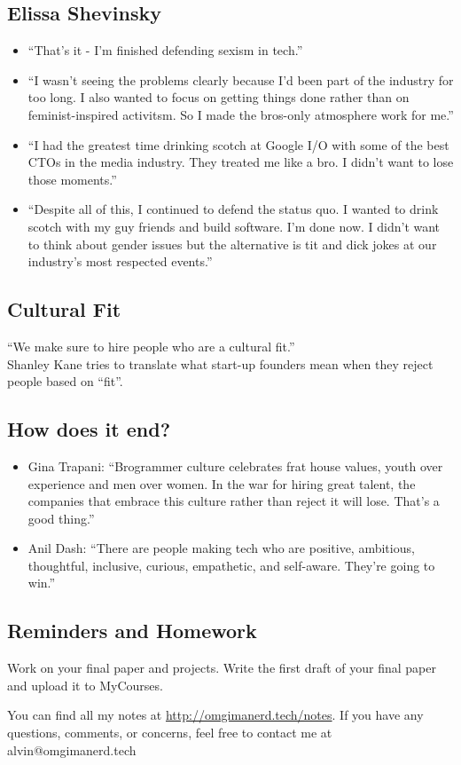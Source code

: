 \documentclass[letterpaper, 12pt]{article}
\begin{document}
\subsection*{Elissa Shevinsky}
\begin{itemize}
  \item ``That's it - I'm finished defending sexism in tech.''
  \item ``I wasn't seeing the problems clearly because I'd been part of the
    industry for too long. I also wanted to focus on getting things done
    rather than on feminist-inspired activitsm. So I made the bros-only
    atmosphere work for me.''
  \item ``I had the greatest time drinking scotch at Google I/O with some of
    the best CTOs in the media industry. They treated me like a bro. I didn't
    want to lose those moments.''
  \item ``Despite all of this, I continued to defend the status quo. I wanted
    to drink scotch with my guy friends and build software. I'm done now. I
    didn't want to think about gender issues but the alternative is tit and
    dick jokes at our industry's most respected events.''
\end{itemize}

\subsection*{Cultural Fit}
``We make sure to hire people who are a cultural fit.'' \\
Shanley Kane tries to translate what start-up founders mean when they reject
people based on ``fit''.

\subsection*{How does it end?}
\begin{itemize}
  \item Gina Trapani: ``Brogrammer culture celebrates frat house values,
    youth over experience and men over women. In the war for hiring great
    talent, the companies that embrace this culture rather than reject it will
    lose. That's a good thing.''
  \item Anil Dash: ``There are people making tech who are positive, ambitious,
    thoughtful, inclusive, curious, empathetic, and self-aware. They're going
    to win.''
\end{itemize}

\subsection*{Reminders and Homework}
Work on your final paper and projects. Write the first draft of your final
paper and upload it to MyCourses.

\begin{center}
  You can find all my notes at \url{http://omgimanerd.tech/notes}. If you have
  any questions, comments, or concerns, feel free to contact me at
  alvin@omgimanerd.tech
\end{center}
\end{document}
